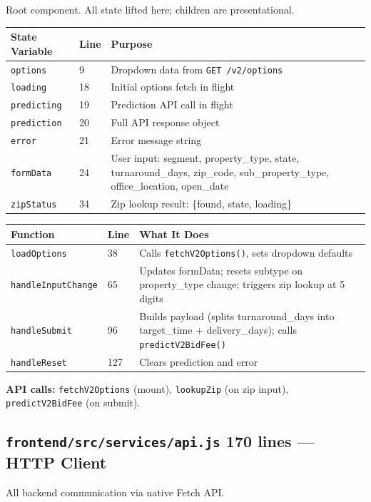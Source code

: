 \documentclass[11pt,a4paper]{article}
\newcommand{\file}[1]{\texttt{\color{gssblue!70!black}#1}}
\newcommand{\func}[1]{\texttt{\color{gssgreen!80!black}#1}}
\newcommand{\uitag}[1]{\colorbox{uipurple!15}{\small\textcolor{uipurple}{\textbf{#1}}}}
\begin{document}
Root component. All state lifted here; children are presentational.

\begin{longtable}{l l p{7.5cm}}
\toprule
\textbf{State Variable} & \textbf{Line} & \textbf{Purpose} \\
\midrule
\endhead
\texttt{options} & 9 & Dropdown data from \texttt{GET /v2/options} \\
\texttt{loading} & 18 & Initial options fetch in flight \\
\texttt{predicting} & 19 & Prediction API call in flight \\
\texttt{prediction} & 20 & Full API response object \\
\texttt{error} & 21 & Error message string \\
\texttt{formData} & 24 & User input: segment, property\_type, state, turnaround\_days, zip\_code, sub\_property\_type, office\_location, open\_date \\
\texttt{zipStatus} & 34 & Zip lookup result: \{found, state, loading\} \\
\bottomrule
\end{longtable}

\begin{longtable}{l l p{7.5cm}}
\toprule
\textbf{Function} & \textbf{Line} & \textbf{What It Does} \\
\midrule
\endhead
\func{loadOptions} & 38 & Calls \func{fetchV2Options()}, sets dropdown defaults \\
\func{handleInputChange} & 65 & Updates formData; resets subtype on property\_type change; triggers zip lookup at 5 digits \\
\func{handleSubmit} & 96 & Builds payload (splits turnaround\_days into target\_time + delivery\_days); calls \func{predictV2BidFee()} \\
\func{handleReset} & 127 & Clears prediction and error \\
\bottomrule
\end{longtable}

\textbf{API calls:} \func{fetchV2Options} (mount), \func{lookupZip} (on zip input), \func{predictV2BidFee} (on submit).

\subsection{\file{frontend/src/services/api.js} \uitag{170 lines} --- HTTP Client}

All backend communication via native Fetch API.
\end{document}
